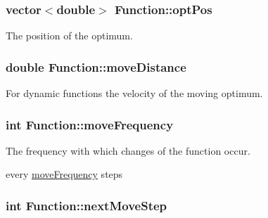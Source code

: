 \hypertarget{classFunction_4c45efc6af5f358ac10a6d4b016ebadc}{
\subsubsection{\setlength{\rightskip}{0pt plus 5cm}vector$<$double$>$ {\bf Function::optPos}}}
\label{classFunction_4c45efc6af5f358ac10a6d4b016ebadc}


The position of the optimum. 

\hypertarget{classFunction_79f1670ff72b16c5b4af46d700dbc66c}{
\subsubsection{\setlength{\rightskip}{0pt plus 5cm}double {\bf Function::moveDistance}}}
\label{classFunction_79f1670ff72b16c5b4af46d700dbc66c}


For dynamic functions the velocity of the moving optimum. 

\hypertarget{classFunction_323cbb2de44582df3b9981e6c3416980}{
\subsubsection{\setlength{\rightskip}{0pt plus 5cm}int {\bf Function::moveFrequency}}}
\label{classFunction_323cbb2de44582df3b9981e6c3416980}


The frequency with which changes of the function occur. 

every \hyperlink{classFunction_323cbb2de44582df3b9981e6c3416980}{moveFrequency} steps \hypertarget{classFunction_990b828c459b554096554d0458e076a5}{
\subsubsection{\setlength{\rightskip}{0pt plus 5cm}int {\bf Function::nextMoveStep}}}
\label{classFunction_990b828c459b554096554d0458e076a5}


